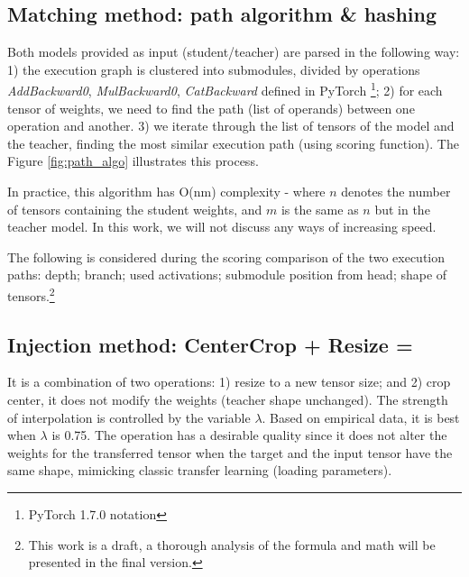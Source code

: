 \documentclass{article} %
\begin{document}

\subsection{Matching method: path algorithm \& hashing}

Both models provided as input (student/teacher) are parsed in the following way:
1) the execution graph is clustered into submodules, divided by operations
\textit{AddBackward0}, \textit{MulBackward0},
\textit{CatBackward} defined in PyTorch \citep{NEURIPS2019}\footnote{PyTorch 1.7.0 notation};
2) for each tensor of weights, we need to find the path (list of operands) between one operation and another.
3) we iterate through the list of tensors of the model and the teacher, finding
the most similar execution path (using scoring function).
The Figure \ref{fig:path_algo} illustrates this process.

In practice, this algorithm has O(nm) complexity - where $n$ denotes the number of tensors containing the student weights, and $m$ is the same as $n$ but in the teacher model.
In this work, we will not discuss any ways of increasing speed.

The following is considered during the scoring comparison of the two execution paths:
depth; branch; used activations; submodule position from head; shape of
tensors.\footnote{This work is a draft, a thorough analysis of the formula and math will be presented in the final version.}

\subsection{Injection method: CenterCrop + Resize = \ComboInjection}

It is a combination of two operations: 1) resize to a new tensor size; and 2)
crop center, it does not modify the weights (teacher shape unchanged).
The strength of interpolation is controlled by the variable $\lambda$. Based on
empirical data, it is best when $\lambda$ is 0.75.
The operation has a desirable quality since it does not alter the weights for
the transferred tensor when the target and the input tensor have the same shape,
mimicking classic transfer learning (loading parameters).
\end{document}
